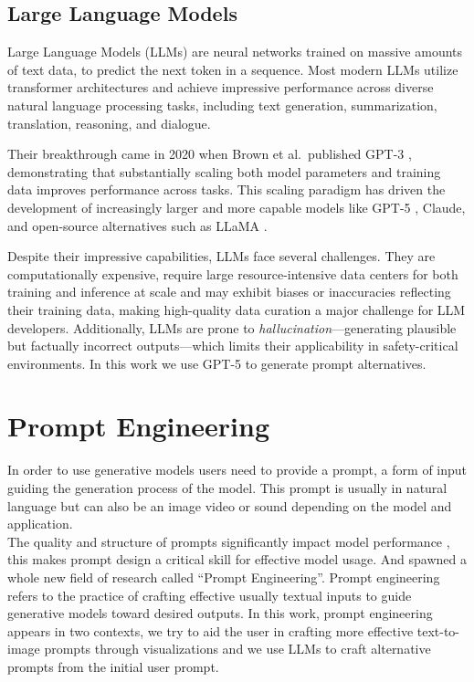 \documentclass[
  a4paper,  %
  twoside,  %
  bibliography=totoc,
  headsepline,
  cleardoublepage=empty,
  parskip=half,
  draft=false
]{scrbook}
\begin{document}
\subsection{Large Language Models}

Large Language Models (LLMs) are neural networks trained on massive amounts of text data, to predict the next token in a sequence. Most modern LLMs utilize transformer architectures \cite{vaswani2023attentionneed} and achieve impressive performance across diverse natural language processing tasks, including text generation, summarization, translation, reasoning, and dialogue.

Their breakthrough came in 2020 when Brown et al.\ published GPT-3 \cite{brown2020languagemodelsfewshotlearners}, demonstrating that substantially scaling both model parameters and training data improves performance across tasks. This scaling paradigm has driven the development of increasingly larger and more capable models like GPT-5 \cite{GPT-4o}, Claude\cite{anthropic2024claude}, and open-source alternatives such as LLaMA \cite{touvron2023llama}.

Despite their impressive capabilities, LLMs face several challenges. They are computationally expensive, require large resource-intensive data centers for both training and inference at scale and may exhibit biases or inaccuracies reflecting their training data, making high-quality data curation a major challenge for LLM developers. Additionally, LLMs are prone to \textit{hallucination}---generating plausible but factually incorrect outputs---which limits their applicability in safety-critical environments.
In this work we use GPT-5 to generate prompt alternatives.






\section{Prompt Engineering}
In order to use generative models users need to provide a prompt, a form of input guiding the generation process of the model. This prompt is usually in natural language but can also be an image video or sound depending on the model and application.\\
The quality and structure of prompts significantly impact model performance \cite{zhang2025understandingrelationshippromptsresponse,li2024effectsdifferentpromptsquality}, this makes prompt design a critical skill for effective model usage. And spawned a whole new field of research called \enquote{Prompt Engineering}.
Prompt engineering refers to the practice of crafting effective usually textual inputs to guide generative models toward desired outputs. In this work, prompt engineering appears in two contexts, we try to aid the user in crafting more effective text-to-image prompts through visualizations and we use LLMs to craft alternative prompts from the initial user prompt.
\end{document}
